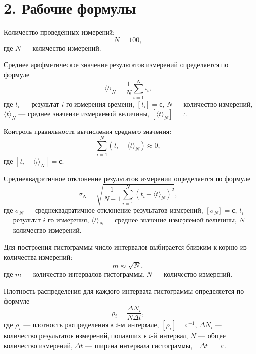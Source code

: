 \documentclass[a4paper,12pt]{article}
\begin{document}
\newpage

\section*{\hspace{30pt} 2. Рабочие формулы}

Количество проведённых измерений:
\begin{equation}
N=100,
\end{equation}
где $N$ --- количество измерений.

Среднее арифметическое значение результатов измерений определяется по формуле
\begin{equation}
\langle t\rangle_N =
\frac{1}{N}\sum_{i=1}^{N}t_i,
\end{equation}
где $t_i$ --- результат $i$-го измерения времени, $[t_i] = \text{с}$, $N$ --- количество измерений, $\langle t\rangle_N$ --- среднее значение измеряемой величины, $[\langle t\rangle_N] = \text{с}$.

Контроль правильности вычисления среднего значения:
\begin{equation}
\sum_{i=1}^{N}(t_i - \langle t\rangle_N) \approx 0,
\end{equation}
где $[t_i - \langle t\rangle_N] = \text{с}$.

Среднеквадратичное отклонение результатов измерений определяется по формуле
\begin{equation}
\sigma_N =
\sqrt{
\frac{1}{N-1}
\sum_{i=1}^{N}
\left(t_i-\langle t\rangle_N\right)^2
},
\end{equation}
где $\sigma_N$ --- среднеквадратичное отклонение результатов измерений, $[\sigma_N] = \text{с}$, $t_i$ --- результат $i$-го измерения, $\langle t\rangle_N$ --- среднее значение измеряемой величины, $N$ --- количество измерений.

Для построения гистограммы число интервалов выбирается близким к корню из количества измерений:
\begin{equation}
m\approx\sqrt{N},
\end{equation}
где $m$ --- количество интервалов гистограммы, $N$ --- количество измерений.

Плотность распределения для каждого интервала гистограммы определяется по формуле
\begin{equation}
\rho_i =
\frac{\Delta N_i}{N\Delta t},
\end{equation}
где $\rho_i$ --- плотность распределения в $i$-м интервале, $[\rho_i] = \text{с}^{-1}$, $\Delta N_i$ --- количество результатов измерений, попавших в $i$-й интервал, $N$ --- общее количество измерений, $\Delta t$ --- ширина интервала гистограммы, $[\Delta t] = \text{с}$.
\end{document}
